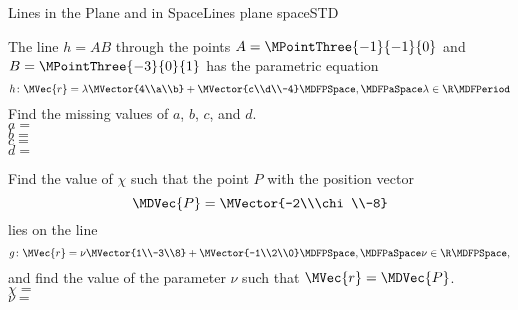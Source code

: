 \begin{MXContent}{Lines in the Plane and in Space}{Lines plane space}{STD}
\begin{MExercise}
\begin{MExerciseItems}
\item{
The line $h=A B$ through the points $A=\MPointThree{-1}{-1}{0}$ and $B=\MPointThree{-3}{0}{1}$ 
has the parametric equation
\[
 h\colon \MVec{r}=\lambda\MVector{4\\a\\b}+\MVector{c\\d\\-4}\MDFPSpace,\MDFPaSpace\lambda\in\R \MDFPeriod
\]
Find the missing values of $a$, $b$, $c$, and $d$.\\
$a=$\\
$b=$\\
$c=$\\
$d=$\\
}
\item{
Find the value of $\chi$ such that the point $P$ with the position vector 
\[
 \MDVec{P}=\MVector{-2\\\chi\\-8}
\]
lies on the line
\[
 g\colon \MVec{r}=\nu\MVector{1\\-3\\8}+\MVector{-1\\2\\0}\MDFPSpace,\MDFPaSpace\nu\in\R \MDFPSpace ,
\]
and find the value of the parameter $\nu$ such that $\MVec{r}=\MDVec{P}$.\\
$\chi=$\\
$\nu=$
}
\end{MExerciseItems}


\end{MExercise}
\end{MXContent}

